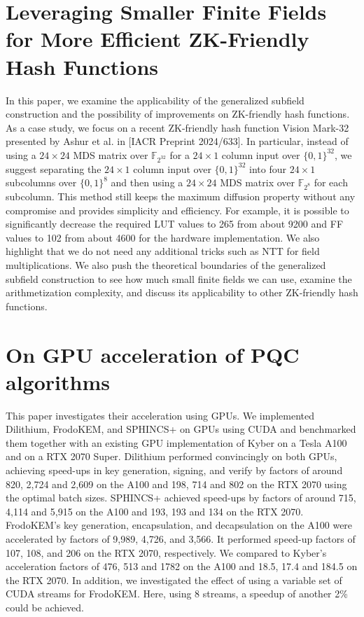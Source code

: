 \documentclass[11pt]{article}
\theoremstyle{definition}
\theoremstyle{remark}
\theoremstyle{plain}
\begin{document}
\section{\cite{cryptoeprint:2025/1593} Leveraging Smaller Finite Fields for More Efficient ZK-Friendly Hash Functions}
In this paper, we examine the applicability of the generalized subfield construction and the possibility of improvements on ZK-friendly hash functions. As a case study, we focus on a recent ZK-friendly hash function Vision Mark-32 presented by Ashur et al. in [IACR Preprint 2024/633]. In particular, instead of using a $24\times 24$ MDS matrix over $\mathbb{F}_{2^{32}}$ for a $24\times 1$ column input over $\{0,1\}^{{32}}$, we suggest separating the $24\times 1$ column input over $\{0,1\}^{{32}}$ into four $24\times 1$ subcolumns over $\{0,1\}^{{8}}$ and then using a $24\times 24$ MDS matrix over $\mathbb{F}_{2^8}$ for each subcolumn. This method still keeps the maximum diffusion property without any compromise and provides simplicity and efficiency. For example, it is possible to significantly decrease the required LUT values to 265 from about 9200 and FF values to 102 from about 4600 for the hardware implementation. We also highlight that we do not need any additional tricks such as NTT for field multiplications. We also push the theoretical boundaries of the generalized subfield construction to see how much small finite fields we can use, examine the arithmetization complexity, and discuss its applicability to other ZK-friendly hash functions.

\section{\cite{cryptoeprint:2025/1596} On GPU acceleration of PQC algorithms}
This paper investigates their acceleration using GPUs. We implemented Dilithium, FrodoKEM, and SPHINCS+ on GPUs using CUDA and benchmarked them together with an existing GPU implementation of Kyber on a Tesla A100 and on a RTX 2070 Super. Dilithium performed convincingly on both GPUs, achieving speed-ups in key generation, signing, and verify by factors of around 820, 2,724 and 2,609 on the A100 and 198, 714 and 802 on the RTX 2070 using the optimal batch sizes. SPHINCS+ achieved speed-ups by factors of around 715, 4,114 and 5,915 on the A100 and 193, 193 and 134 on the RTX 2070. FrodoKEM’s key generation, encapsulation, and decapsulation on the A100 were accelerated by factors of 9,989, 4,726, and 3,566. It performed speed-up factors of 107, 108, and 206 on the RTX 2070, respectively. We compared to Kyber's acceleration factors of 476, 513 and 1782 on the A100 and 18.5, 17.4 and 184.5 on the RTX 2070. In addition, we investigated the effect of using a variable set of CUDA streams for FrodoKEM. Here, using 8 streams, a speedup of another 2\% could be achieved.
\end{document}
